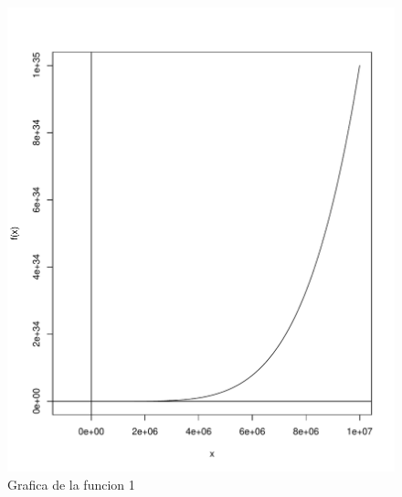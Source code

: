 \documentclass[12pt,a4paper]{article}
\begin{document}
\begin{figure}
\centering
\includegraphics[scale=.8]{G2}
\caption{Grafica de la funcion 1}
\label{fig:G2}
\end{figure}
\end{document}
